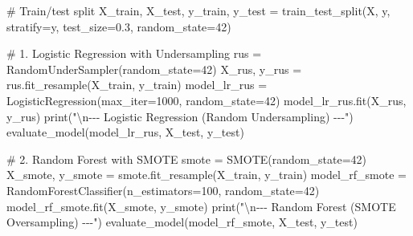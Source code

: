\documentclass[
  letterpaper,
  DIV=11,
  numbers=noendperiod]{scrartcl}
\newenvironment{Shaded}{\begin{snugshade}}{\end{snugshade}}
\newcommand{\BuiltInTok}[1]{\textcolor[rgb]{0.00,0.23,0.31}{#1}}
\newcommand{\CharTok}[1]{\textcolor[rgb]{0.13,0.47,0.30}{#1}}
\newcommand{\CommentTok}[1]{\textcolor[rgb]{0.37,0.37,0.37}{#1}}
\newcommand{\DecValTok}[1]{\textcolor[rgb]{0.68,0.00,0.00}{#1}}
\newcommand{\FloatTok}[1]{\textcolor[rgb]{0.68,0.00,0.00}{#1}}
\newcommand{\NormalTok}[1]{\textcolor[rgb]{0.00,0.23,0.31}{#1}}
\newcommand{\OperatorTok}[1]{\textcolor[rgb]{0.37,0.37,0.37}{#1}}
\newcommand{\StringTok}[1]{\textcolor[rgb]{0.13,0.47,0.30}{#1}}
\begin{document}
\begin{Shaded}
\begin{Highlighting}[]
    \CommentTok{\# Train/test split}
\NormalTok{    X\_train, X\_test, y\_train, y\_test }\OperatorTok{=}\NormalTok{ train\_test\_split(X, y, stratify}\OperatorTok{=}\NormalTok{y, test\_size}\OperatorTok{=}\FloatTok{0.3}\NormalTok{, random\_state}\OperatorTok{=}\DecValTok{42}\NormalTok{)}

    \CommentTok{\# 1. Logistic Regression with Undersampling}
\NormalTok{    rus }\OperatorTok{=}\NormalTok{ RandomUnderSampler(random\_state}\OperatorTok{=}\DecValTok{42}\NormalTok{)}
\NormalTok{    X\_rus, y\_rus }\OperatorTok{=}\NormalTok{ rus.fit\_resample(X\_train, y\_train)}
\NormalTok{    model\_lr\_rus }\OperatorTok{=}\NormalTok{ LogisticRegression(max\_iter}\OperatorTok{=}\DecValTok{1000}\NormalTok{, random\_state}\OperatorTok{=}\DecValTok{42}\NormalTok{)}
\NormalTok{    model\_lr\_rus.fit(X\_rus, y\_rus)}
    \BuiltInTok{print}\NormalTok{(}\StringTok{"}\CharTok{\textbackslash{}n}\StringTok{{-}{-}{-} Logistic Regression (Random Undersampling) {-}{-}{-}"}\NormalTok{)}
\NormalTok{    evaluate\_model(model\_lr\_rus, X\_test, y\_test)}

    \CommentTok{\# 2. Random Forest with SMOTE}
\NormalTok{    smote }\OperatorTok{=}\NormalTok{ SMOTE(random\_state}\OperatorTok{=}\DecValTok{42}\NormalTok{)}
\NormalTok{    X\_smote, y\_smote }\OperatorTok{=}\NormalTok{ smote.fit\_resample(X\_train, y\_train)}
\NormalTok{    model\_rf\_smote }\OperatorTok{=}\NormalTok{ RandomForestClassifier(n\_estimators}\OperatorTok{=}\DecValTok{100}\NormalTok{, random\_state}\OperatorTok{=}\DecValTok{42}\NormalTok{)}
\NormalTok{    model\_rf\_smote.fit(X\_smote, y\_smote)}
    \BuiltInTok{print}\NormalTok{(}\StringTok{"}\CharTok{\textbackslash{}n}\StringTok{{-}{-}{-} Random Forest (SMOTE Oversampling) {-}{-}{-}"}\NormalTok{)}
\NormalTok{    evaluate\_model(model\_rf\_smote, X\_test, y\_test)}


\end{Highlighting}
\end{Shaded}
\end{document}
